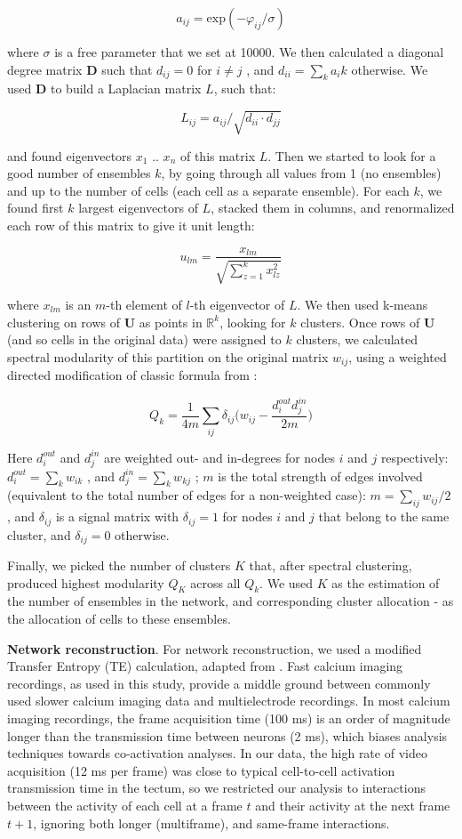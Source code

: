 \documentclass{article}
\begin{document}
\[ a_{ij} = \text{exp}(-\varphi_{ij}/\sigma) \]

where $\sigma$ is a free parameter that we set at 10000. We then calculated a diagonal degree matrix $\mathbf{D}$ such that $d_{ij} = 0$ for $i \neq j$ , and $d_{ii} = \sum_k{a_ik}$ otherwise. We used $\mathbf{D}$ to build a Laplacian matrix $L$, such that:

\[ L_{ij} = a_{ij}/\sqrt{d_{ii}\cdot d_{jj}} \]

and found eigenvectors $x_1$ .. $x_n$ of this matrix $L$. Then we started to look for a good number of ensembles $k$, by going through all values from 1 (no ensembles) and up to the number of cells (each cell as a separate ensemble). For each $k$, we found first $k$ largest eigenvectors of $L$, stacked them in columns, and renormalized each row of this matrix to give it unit length:

\[ u_{lm} = \frac{x_{lm}}{\sqrt{\sum_{z=1}^{k}{x_{lz}^2}}} \]

where $x_{lm}$ is an $m$-th element of $l$-th eigenvector of $L$. We then used k-means clustering on rows of $\textbf{U}$ as points in $\mathbb{R}^k$, looking for $k$ clusters. Once rows of $\textbf{U}$ (and so cells in the original data) were assigned to $k$ clusters, we calculated spectral modularity of this partition on the original matrix $w_{ij}$, using a weighted directed modification of classic formula from \citep{newman2006modularity}:

\[ Q_k = \frac{1}{4m}\sum_{ij}{\delta_{ij}\Big(w_{ij}-\frac{d^{out}_i d^{in}_j}{2m}}\Big) \]

Here $d^{out}_i$ and $d^{in}_j$ are weighted out- and in-degrees for nodes $i$ and $j$ respectively: $d^{out}_i = \sum_k{w_{ik}}$ , and $d^{in}_j = \sum_k{w_{kj}}$ ; $m$ is the total strength of edges involved (equivalent to the total number of edges for a non-weighted case): $m = \sum_{ij}{w_{ij}}/2$ , and $\delta_{ij}$ is a signal matrix with $\delta_{ij}=1$ for nodes $i$ and $j$ that belong to the same cluster, and $\delta_{ij} = 0$ otherwise. 

Finally, we picked the number of clusters $K$ that, after spectral clustering, produced highest modularity $Q_K$ across all $Q_k$. We used $K$ as the estimation of the number of ensembles in the network, and corresponding cluster allocation - as the allocation of cells to these ensembles.

\textbf{Network reconstruction}. For network reconstruction, we used a modified Transfer Entropy (TE) calculation, adapted from \citep{gourevitch2007te, stetter2012te}. Fast calcium imaging recordings, as used in this study, provide a middle ground between commonly used slower calcium imaging data and multielectrode recordings. In most calcium imaging recordings, the frame acquisition time (100 ms) is an order of magnitude longer than the transmission time between neurons (2 ms), which biases analysis techniques towards co-activation analyses. In our data, the high rate of video acquisition (12 ms per frame) was close to typical cell-to-cell activation transmission time in the tectum, so we restricted our analysis to interactions between the activity of each cell at a frame $t$ and their activity at the next frame $t+1$, ignoring both longer (multiframe), and same-frame interactions.
\end{document}
